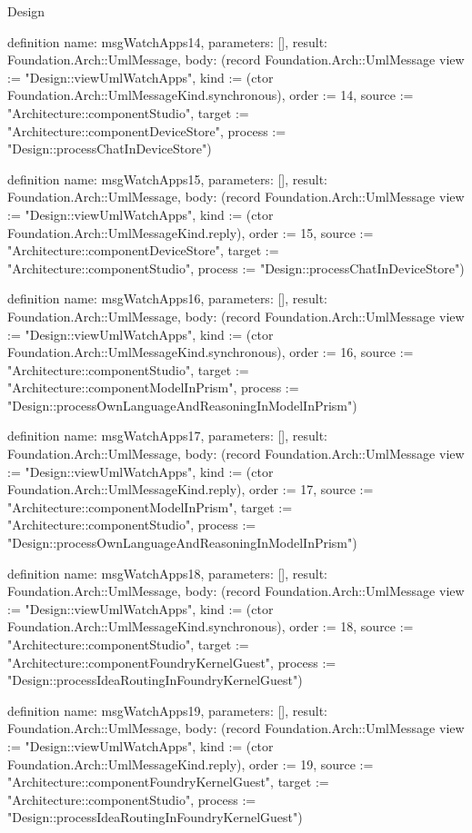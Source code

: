 \begin{lexlean}{Design}
\begin{semanticmodule}
definition{
  name: msgWatchApps14,
  parameters: [],
  result: Foundation.Arch::UmlMessage,
  body: (record Foundation.Arch::UmlMessage {view := "Design::viewUmlWatchApps", kind := (ctor Foundation.Arch::UmlMessageKind.synchronous), order := 14, source := "Architecture::componentStudio", target := "Architecture::componentDeviceStore", process := "Design::processChatInDeviceStore"})
}

definition{
  name: msgWatchApps15,
  parameters: [],
  result: Foundation.Arch::UmlMessage,
  body: (record Foundation.Arch::UmlMessage {view := "Design::viewUmlWatchApps", kind := (ctor Foundation.Arch::UmlMessageKind.reply), order := 15, source := "Architecture::componentDeviceStore", target := "Architecture::componentStudio", process := "Design::processChatInDeviceStore"})
}

definition{
  name: msgWatchApps16,
  parameters: [],
  result: Foundation.Arch::UmlMessage,
  body: (record Foundation.Arch::UmlMessage {view := "Design::viewUmlWatchApps", kind := (ctor Foundation.Arch::UmlMessageKind.synchronous), order := 16, source := "Architecture::componentStudio", target := "Architecture::componentModelInPrism", process := "Design::processOwnLanguageAndReasoningInModelInPrism"})
}

definition{
  name: msgWatchApps17,
  parameters: [],
  result: Foundation.Arch::UmlMessage,
  body: (record Foundation.Arch::UmlMessage {view := "Design::viewUmlWatchApps", kind := (ctor Foundation.Arch::UmlMessageKind.reply), order := 17, source := "Architecture::componentModelInPrism", target := "Architecture::componentStudio", process := "Design::processOwnLanguageAndReasoningInModelInPrism"})
}

definition{
  name: msgWatchApps18,
  parameters: [],
  result: Foundation.Arch::UmlMessage,
  body: (record Foundation.Arch::UmlMessage {view := "Design::viewUmlWatchApps", kind := (ctor Foundation.Arch::UmlMessageKind.synchronous), order := 18, source := "Architecture::componentStudio", target := "Architecture::componentFoundryKernelGuest", process := "Design::processIdeaRoutingInFoundryKernelGuest"})
}

definition{
  name: msgWatchApps19,
  parameters: [],
  result: Foundation.Arch::UmlMessage,
  body: (record Foundation.Arch::UmlMessage {view := "Design::viewUmlWatchApps", kind := (ctor Foundation.Arch::UmlMessageKind.reply), order := 19, source := "Architecture::componentFoundryKernelGuest", target := "Architecture::componentStudio", process := "Design::processIdeaRoutingInFoundryKernelGuest"})
}


\end{semanticmodule}
\end{lexlean}
